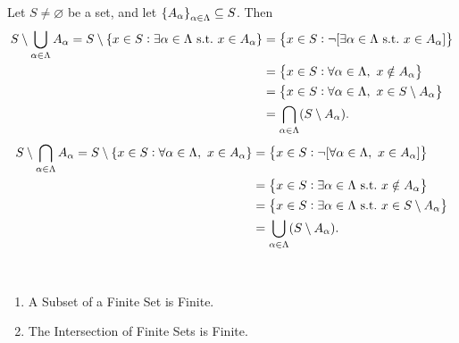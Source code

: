 \documentclass[11pt,openany]{article}
\begin{document}
\vfill
\begin{note}
	Let $S\neq\varnothing$ be a set, and let $\set{A_\alpha}_{\alpha\in\Lambda}\subseteq S$. Then
	\begin{align*}
		S\setminus\bigcup_{\alpha\in\Lambda}A_\alpha=S\setminus\set{x\in S:\exists \alpha\in\Lambda\ \text{s.t.}\ x\in A_\alpha}
		&=\set{x\in S:\lnot [\exists \alpha\in\Lambda\ \text{s.t.}\ x\in A_\alpha]}\\
		&=\set{x\in S:\forall \alpha\in\Lambda,\ x\notin A_\alpha}\\
		&=\set{x\in S:\forall \alpha\in\Lambda,\ x\in S\setminus A_\alpha}\\
		&=\bigcap_{\alpha\in\Lambda}(S\setminus A_\alpha).
	\end{align*}
	\begin{align*}
		S\setminus\bigcap_{\alpha\in\Lambda}A_\alpha=S\setminus\set{x\in S:\forall\alpha\in\Lambda,\ x\in A_\alpha}
		&=\set{x\in S:\lnot [\forall\alpha\in\Lambda,\ x\in A_\alpha]}\\
		&=\set{x\in S:\exists \alpha\in\Lambda\ \text{s.t.}\ x\notin A_\alpha}\\
		&=\set{x\in S:\exists \alpha\in\Lambda\ \text{s.t.}\ x\in S\setminus A_\alpha}\\
		&=\bigcup_{\alpha\in\Lambda}(S\setminus A_\alpha).
	\end{align*}
\end{note}
\vfill
\begin{note}
\ \begin{enumerate}[(1)]
	\item A Subset of a Finite Set is Finite.
	\item The Intersection of Finite Sets is Finite.
\end{enumerate}
\end{note}
\vfill
\end{document}
